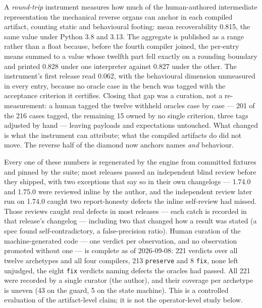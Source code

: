 \documentclass[11pt]{article}
\begin{document}
A \emph{round-trip} instrument measures how much of the human-authored intermediate
representation the mechanical reverse organs can anchor in each compiled artifact,
counting static and behavioural footing: mean recoverability 0.815, the same value
under Python 3.8 and 3.13. The aggregate is published as a range rather than a float
because, before the fourth compiler joined, the per-entry means summed to a value whose
twelfth part fell exactly on a rounding boundary and printed 0.828 under one
interpreter against 0.827 under the other. The instrument's first release read 0.062,
with the behavioural dimension unmeasured in every entry, because no oracle case in the
bench was tagged with the acceptance criterion it certifies. Closing that gap was a
curation, not a re-measurement: a human tagged the twelve withheld oracles case by case
--- 201 of the 216 cases tagged, the remaining 15 owned by no single criterion, three
tags adjusted by hand --- leaving payloads and expectations untouched. What changed is
what the instrument can attribute; what the compiled artifacts do did not move. The
reverse half of the diamond now anchors names \emph{and} behaviour.

Every one of these numbers is regenerated by the engine from committed fixtures
and pinned by the suite; most releases passed an independent blind review before they
shipped, with two exceptions that say so in their own changelogs --- 1.74.0 and 1.75.0
were reviewed inline by the author, and the independent review later run on 1.74.0
caught two report-honesty defects the inline self-review had missed. Those reviews
caught real defects in most releases --- each catch is recorded in that release's
changelog --- including two
that changed how a result was stated (a spec found self-contradictory, a
false-precision ratio). Human curation of the machine-generated code --- one verdict
per observation, and no observation promoted without one --- is complete as of
2026-09-08: 221 verdicts over all twelve archetypes and all four compilers, 213
\texttt{preserve} and 8 \texttt{fix}, none left unjudged, the eight \texttt{fix}
verdicts naming defects the oracles had passed. All 221 were recorded by a single
curator (the author), and their coverage per archetype is uneven (43 on the guard, 5 on
the state machine).
This is a controlled evaluation of the artifact-level claim; it is not the
operator-level study below.
\end{document}
